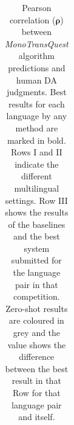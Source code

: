 \begin{table}[t]
\begin{center}
\begin{tabular}{l l  c c c c c c c}
			\bottomrule
		\end{tabular}
	\end{center}
	\caption[Pearson correlation between MonoTransQuest algorithm predictions and human DA judgments]{Pearson correlation ($\bm{\rho}$) between \textit{MonoTransQuest} algorithm predictions and human DA judgments. Best results for each language by any method are marked in bold. Rows I and II indicate the different multilingual settings. Row III shows the results of the baselines and the best system submitted for the language pair in that competition. Zero-shot results are coloured in grey and the value shows the difference between the best result in that Row for that language pair and itself. }
	\label{tab:multilingual_direct_assesement}
\end{table}


\renewcommand{\arraystretch}{1.2}
